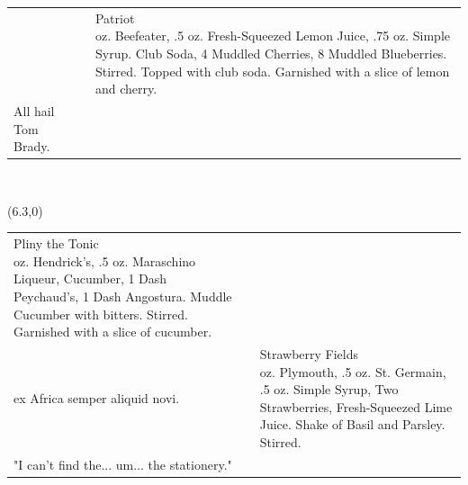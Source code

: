 \documentclass{article}
\makeatletter
\newcommand \Dotfill {\leavevmode \cleaders \hb@xt@ .25em{\hss .\hss }\hfill \kern \z@}%
\makeatother
\begin{document}
{\begin{tabular}{m{}m{}m{}}
&
&
{\centering\Huge{Patriot}\\*}
\centering 1.5 oz. Beefeater, .5 oz. Fresh-Squeezed Lemon Juice, .75 oz. Simple Syrup. Club Soda, 4 Muddled Cherries, 8 Muddled Blueberries. Stirred. Topped with club soda. Garnished with a slice of lemon and cherry.\\
\centering\small{All hail Tom Brady.}
\end{tabular}\\[-4pt]
\makebox[\columnwidth]{\Huge\Dotfill}
\begin{textblock}{1}(6.3,0)\rotatebox{90}{\makebox[.23\paperheight]{\Huge\Dotfill}}\end{textblock}

\begin{tabular}{m{}m{}m{}}
{\centering\Huge{Pliny the Tonic}\\*}
\centering 2 oz. Hendrick's, .5 oz. Maraschino Liqueur, Cucumber, 1 Dash Peychaud's, 1 Dash Angostura. Muddle Cucumber with bitters. Stirred. Garnished with a slice of cucumber.\\
\centering\small{ex Africa semper aliquid novi.}
&
&
{\centering\Huge{Strawberry Fields}\\*}
\centering 2 oz. Plymouth, .5 oz. St. Germain, .5 oz. Simple Syrup, Two Strawberries, Fresh-Squeezed Lime Juice. Shake of Basil and Parsley. Stirred.\\
\centering\small{"I can't find the... um... the stationery."}
\end{tabular}
\\\makebox[\columnwidth]{\Huge\Dotfill}

}
\end{document}

